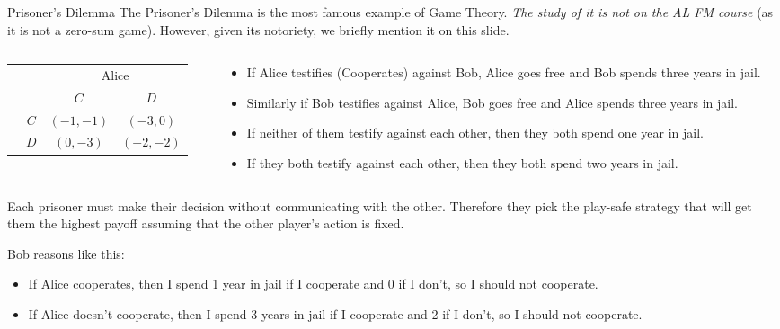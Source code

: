 \documentclass[8pt]{beamer}
\begin{document}
\begin{frame}[shrink=18]{Prisoner's Dilemma}
	\alert<1>{The Prisoner's Dilemma is the most famous example of Game Theory. \emph{The study of it is not on the AL FM course} (as it is not a zero-sum game). However, given its notoriety, we briefly mention it on this slide.}
	\begin{columns}
	\begin{column}{.35\linewidth}
			\begin{center}
			\colorbox{cc}{
  \setlength\arrayrulewidth{0.5mm}
	\begin{tabular}{cc|cc}
\multicolumn{2}{c}{} & \multicolumn{2}{c}{Alice}\\
\multicolumn{1}{c}{} &  & $C$  & $D$ \\ \hline 
\raisebox{0cm}{\multirow{2}*{\rotatebox{90}{Bob}}}  & $C$ & $(-1,-1)$ & $(-3,0)$ \\
						      & $D$ & $(0,-3)$ & $(-2,-2)$ \\
\end{tabular}}
\end{center}
	\end{column}
	\begin{column}{.65\linewidth}
		\begin{itemize}
			\item If Alice testifies (Cooperates) against Bob, Alice goes free and Bob spends three years in jail.
			\item Similarly if Bob testifies against Alice, Bob goes free and Alice spends three years in jail.
			\item If neither of them testify against each other, then they both spend one year in jail. 
			\item If they both testify against each other, then they both spend two years in jail.
		\end{itemize}
	\end{column}
	\end{columns}
	Each prisoner must make their decision without communicating with the other. Therefore they pick the play-safe strategy that will get them the highest payoff assuming that the other player's action is fixed.

	Bob reasons like this:
	\begin{itemize}
		\item If Alice cooperates, then I spend 1 year in jail if I cooperate and 0 if I don’t, so I should not cooperate.
		\item If Alice doesn’t cooperate, then I spend 3 years in jail if I cooperate and 2 if I don’t, so I should not cooperate.
	\end{itemize}


\end{frame}
\end{document}
